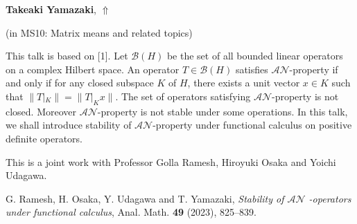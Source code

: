 \documentclass[ILAS2025-program.tex]{subfiles}
\begin{document}
     \hypertarget{down0022}{}\begin{ilasabstract}
    
    \textbf{Takeaki Yamazaki},  \hfill \hyperlink{up0022}{$\Uparrow$}
    
    (in {\color{mstitle}MS10: Matrix means and related topics})
        
        \mtskip
    This talk is based on [1].
Let $\mathcal{B}(H)$ be the set of all bounded linear operators on a complex Hilbert space. An operator $T\in \mathcal{B}(H)$ satisfies $\mathcal{AN}$-property if and only if for any closed subspace $K$ of $H$, there exists a unit vector $x\in K$ such that $\|T|_{K}\|=\|T|_{K}x\|$. The set of operators satisfying $\mathcal{AN}$-property is not closed. 
Moreover $\mathcal{AN}$-property is not stable under some operations.
In this talk, we shall introduce stability of $\mathcal{AN}$-property under functional calculus on positive definite operators.

This is a joint work with Professor Golla Ramesh, Hiroyuki Osaka and Yoichi Udagawa.

\noindent
[1] G. Ramesh, H. Osaka,
Y. Udagawa and T. Yamazaki, {\it Stability of  $\mathcal{AN}$ -operators under functional calculus},
Anal. Math. {\bf 49} (2023), 825--839.
\end{ilasabstract}
\end{document}

